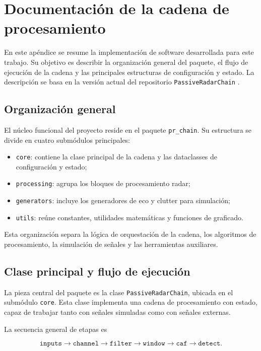 \chapter{Documentación de la cadena de procesamiento}
\label{ap:documentacion_codigo}

En este apéndice se resume la implementación de software desarrollada para este trabajo. Su objetivo es describir la organización general del paquete, el flujo de ejecución de la cadena y las principales estructuras de configuración y estado. La descripción se basa en la versión actual del repositorio \texttt{PassiveRadarChain} \cite{github-repo}.

\section{Organización general}

El núcleo funcional del proyecto reside en el paquete \texttt{pr\_chain}. Su estructura se divide en cuatro submódulos principales:

\begin{itemize}
    \item \texttt{core}: contiene la clase principal de la cadena y las dataclasses de configuración y estado;
    \item \texttt{processing}: agrupa los bloques de procesamiento radar;
    \item \texttt{generators}: incluye los generadores de eco y clutter para simulación;
    \item \texttt{utils}: reúne constantes, utilidades matemáticas y funciones de graficado.
\end{itemize}

Esta organización separa la lógica de orquestación de la cadena, los algoritmos de procesamiento, la simulación de señales y las herramientas auxiliares.

\section{Clase principal y flujo de ejecución}

La pieza central del paquete es la clase \texttt{PassiveRadarChain}, ubicada en el submódulo \texttt{core}. Esta clase implementa una cadena de procesamiento con estado, capaz de trabajar tanto con señales simuladas como con señales externas.

La secuencia general de etapas es

\begin{equation*}
\texttt{inputs} \rightarrow
\texttt{channel} \rightarrow
\texttt{filter} \rightarrow
\texttt{window} \rightarrow
\texttt{caf} \rightarrow
\texttt{detect}.
\end{equation*}

